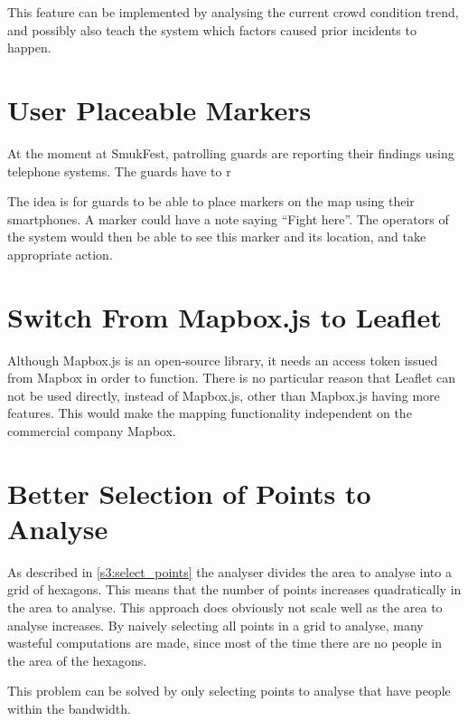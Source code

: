 This feature can be implemented by analysing the current crowd condition trend, and possibly also teach the system which factors caused prior incidents to happen.

\section{User Placeable Markers}
At the moment at SmukFest, patrolling guards are reporting their findings using telephone systems.  The guards have to r

The idea is for guards to be able to place markers on the map using their smartphones. A marker could have a note saying \enquote{Fight here}. The operators of the system would then be able to see this marker and its location, and take appropriate action.

\section{Switch From Mapbox.js to Leaflet}
Although Mapbox.js is an open-source library, it needs an access token issued from Mapbox in order to function. There is no particular reason that Leaflet can not be used directly, instead of Mapbox.js, other than Mapbox.js having more features. This would make the mapping functionality independent on the commercial company Mapbox.

\section{Better Selection of Points to Analyse}
As described in \cref{s3:select_points} the analyser divides the area to analyse into a grid of hexagons. This means that the number of points increases quadratically in the area to analyse.  This approach does obviously not scale well as the area to analyse increases. By naively selecting all points in a grid to analyse, many wasteful computations are made, since most of the time there are no people in the area of the hexagons.

This problem can be solved by only selecting points to analyse that have people within the bandwidth.